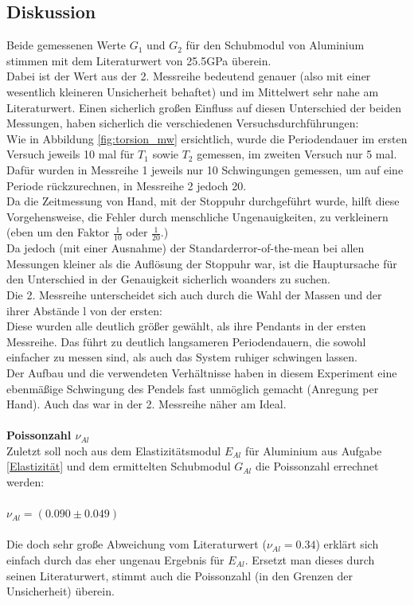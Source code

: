 \documentclass[12pt,a4paper]{article}
\begin{document}
\begin{multicols}{2}
\subsection{Diskussion}
Beide gemessenen Werte $G_1$ und $G_2$ für den Schubmodul von Aluminium stimmen mit dem Literaturwert von 25.5GPa überein.\\
Dabei ist der Wert aus der 2. Messreihe bedeutend genauer (also mit einer wesentlich kleineren Unsicherheit behaftet) und im Mittelwert sehr nahe am Literaturwert.
Einen sicherlich großen Einfluss auf diesen Unterschied der beiden Messungen, haben sicherlich die verschiedenen Versuchsdurchführungen:\\
Wie in Abbildung \ref{fig:torsion_mw} ersichtlich, wurde die Periodendauer im ersten Versuch jeweils 10 mal für $T_1$ sowie $T_2$ gemessen, im zweiten Versuch nur 5 mal. Dafür wurden in Messreihe 1 jeweils nur 10 Schwingungen gemessen, um auf eine Periode rückzurechnen, in Messreihe 2 jedoch 20.\\
Da die Zeitmessung von Hand, mit der Stoppuhr durchgeführt wurde, hilft diese Vorgehensweise, die Fehler durch menschliche Ungenauigkeiten, zu verkleinern (eben um den Faktor $\frac{1}{10}$ oder $\frac{1}{20}$.)\\
Da jedoch (mit einer Ausnahme) der Standarderror-of-the-mean bei allen Messungen kleiner als die Auflösung der Stoppuhr war, ist die Hauptursache für den Unterschied in der Genauigkeit sicherlich woanders zu suchen.\\
Die 2. Messreihe unterscheidet sich auch durch die Wahl der Massen und der ihrer Abstände l von der ersten:\\
Diese wurden alle deutlich größer gewählt, als ihre Pendants in der ersten Messreihe. Das führt zu deutlich langsameren Periodendauern, die sowohl einfacher zu messen sind, als auch das System ruhiger schwingen lassen.\\
Der Aufbau und die verwendeten Verhältnisse haben in diesem Experiment eine ebenmäßige Schwingung des Pendels fast unmöglich gemacht (Anregung per Hand). Auch das war in der 2. Messreihe näher am Ideal.\\
\\
\textbf{Poissonzahl $\nu_{Al}$}\\
Zuletzt soll noch aus dem Elastizitätsmodul $E_{Al}$ für Aluminium aus Aufgabe \ref{Elastizität} und dem ermittelten Schubmodul $G_{Al}$ die Poissonzahl errechnet werden:\\
\\
$\nu_{Al} = (0.090 \pm 0.049)$\\
\\
Die doch sehr große Abweichung vom Literaturwert ($\nu_{Al}=0.34$) erklärt sich einfach durch das eher ungenau Ergebnis für $E_{Al}$. Ersetzt man dieses durch seinen Literaturwert, stimmt auch die Poissonzahl (in den Grenzen der Unsicherheit) überein.



\end{multicols}
\end{document}
